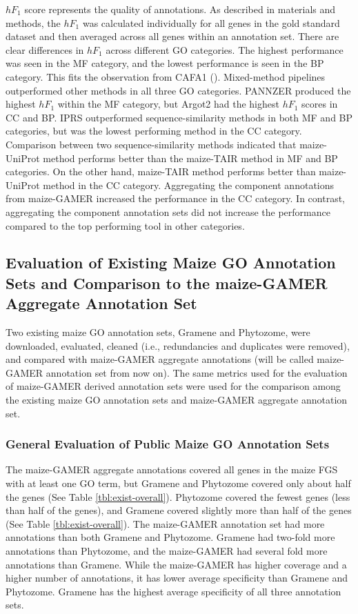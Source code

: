 $hF_1$ score represents the quality of annotations. As described in materials and methods, the $hF_1$ was calculated individually for all genes in the gold standard dataset and then averaged across all genes within an annotation set. There are clear differences in $hF_1$ across different GO categories. The highest performance was seen in the MF category, and the lowest performance is seen in the BP category. This fits the observation from CAFA1 (\cite{radivojac_2013-YN}). Mixed-method pipelines outperformed other methods in all three GO categories. PANNZER produced the highest $hF_1$ within the MF category, but Argot2 had the highest $hF_1$ scores in CC and BP. IPRS outperformed sequence-similarity methods in both MF and BP categories, but was the lowest performing method in the CC category. Comparison between two sequence-similarity methods indicated that maize-UniProt method performs better than the maize-TAIR method in MF and BP categories. On the other hand, maize-TAIR method performs better than maize-UniProt method in the CC category. Aggregating the component annotations from maize-GAMER  increased the performance in the CC category. In contrast, aggregating the component annotation sets did not increase the performance compared to the top performing tool in other categories.

\subsection{Evaluation of Existing Maize GO Annotation Sets and Comparison to the maize-GAMER Aggregate Annotation Set}
Two existing maize GO annotation sets, Gramene and Phytozome, were downloaded, evaluated, cleaned (i.e., redundancies and duplicates were removed), and compared with maize-GAMER aggregate annotations (will be called maize-GAMER annotation set from now on). The same metrics used for the evaluation of maize-GAMER derived annotation sets were used for the comparison among the existing maize GO annotation sets and maize-GAMER aggregate annotation set.

\subsubsection{General Evaluation of Public Maize GO Annotation Sets}
The maize-GAMER aggregate annotations covered all genes in the maize FGS with at least one GO term, but Gramene and Phytozome covered only about half the genes (See Table \ref{tbl:exist-overall}). Phytozome covered the fewest genes (less than half of the genes), and Gramene covered slightly more than half of the genes (See Table \ref{tbl:exist-overall}). The maize-GAMER annotation set had more annotations than both Gramene and Phytozome. Gramene had two-fold more annotations than Phytozome, and the maize-GAMER had several fold more annotations than Gramene. While the maize-GAMER has higher coverage and a higher number of annotations, it has lower average specificity than Gramene and Phytozome. Gramene has the highest average specificity of all three annotation sets.


